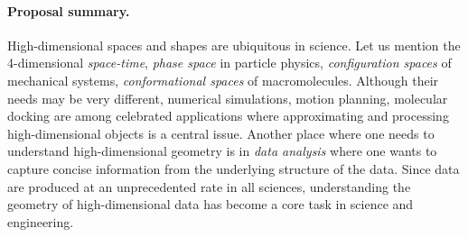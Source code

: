 \documentclass[a4paper, 11pt]{article}
\begin{document}
\paragraph{Proposal summary.} High-dimensional spaces and shapes
are ubiquitous in science.  Let us mention the  4-dimensional {\em space-time},  {\em phase space} in particle physics, {\em configuration spaces} of mechanical systems, {\em conformational spaces} of macromolecules.  Although their needs may be very different, numerical simulations, motion planning, molecular docking are among celebrated applications where approximating and processing high-dimensional objects is a central issue. 
Another place where one needs to understand
high-dimensional geometry is in {\em data analysis} where one wants to
capture concise information from the underlying structure of the data.  %
Since data are produced at an unprecedented rate in all
sciences, understanding the geometry of high-dimensional data %
has become a core task in science and engineering.

\end{document}
